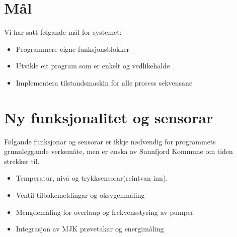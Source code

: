 \newpage
\section{Mål}
Vi har satt følgande mål for systemet:

\begin{itemize}
    \item Programmere eigne funksjonsblokker
    \item Utvikle eit program som er enkelt og vedlikehalde
    \item Implementera tilstandsmaskin for alle prosess sekvensane
\end{itemize}

\section{Ny funksjonalitet og sensorar}
Følgande funksjonar og sensorar er ikkje nødvendig for programmets grunnleggande verkemåte, men 
er ønska av \gls{Sunnfjord Kommune} om tiden strekker til.  
\begin{itemize}
    \item Temperatur, nivå og trykksensorar(reintvan inn).
    \item Ventil tilbakemeldingar og oksygenmåling
    \item Mengdemåling for overlaup og frekvensstyring av pumper
    \item Integrasjon av \gls{MJK} prøvetakar og energimåling
\end{itemize}

